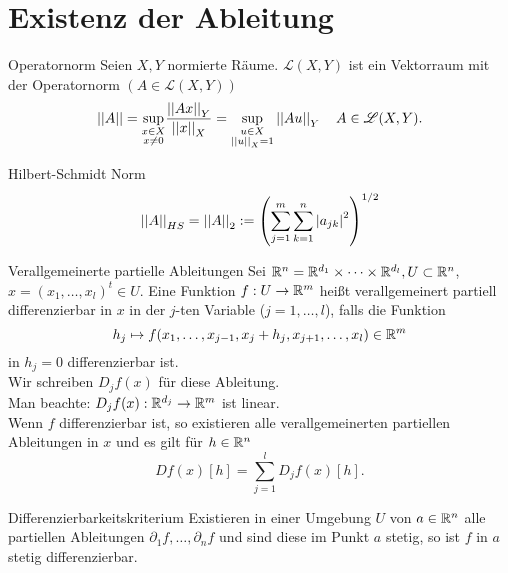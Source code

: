 \documentclass[main.tex]{subfiles}
\begin{document}
\section*{Existenz der Ableitung}

\begin{karte}{Operatornorm}
    Seien \(X, Y\) normierte Räume. 
    \( \mathscr{L}(X,Y) \) ist ein Vektorraum mit
    der Operatornorm \( (A \in \mathscr{L}(X,Y)) \)
    \[ \left|\left|A\right|\right| = \underset{\substack{x\in X\\x\neq 0}}{\sup}
    \frac{\left|\left|Ax\right|\right|_Y}{\left|\left|x\right|\right|_X} 
    = \underset{\substack{u\in X\\ \left|\left|u\right|\right|_X = 1}}{\sup}
    \left|\left|Au\right|\right|_Y
    \quad A \in \mathscr{L}(X,Y). \]
\end{karte}

\begin{karte}{Hilbert-Schmidt Norm}
    \[ \left|\left|A\right|\right|_{HS} = \left|\left|A\right|\right|_2 := \left( 
        \sum_{j=1}^m \sum_{k=1}^n \left| a_{jk} \right|^2 \right)^{1/2} \]
\end{karte}

\begin{karte}{Verallgemeinerte partielle Ableitungen}
    Sei \( \mathbb{R}^n = \mathbb{R}^{d_1} \times \dots \times \mathbb{R}^{d_l}, U \subset \mathbb{R}^n \),
    \( x = (x_1, \ldots, x_l)^t \in U \).
    Eine Funktion \( f : U \rightarrow \mathbb{R}^m \) heißt verallgemeinert
    partiell differenzierbar in \(x\) in der \(j\)-ten 
    Variable (\(j = 1, \ldots, l\)), falls die Funktion 
    \[ h_j \mapsto f(x_1,\ldots, x_{j-1}, x_j + h_j, 
    x_{j+1}, \ldots, x_l) \in \mathbb{R}^m \] 
    in \( h_j = 0 \) differenzierbar ist.\\
    Wir schreiben \(D_jf(x)\) für diese Ableitung.\\
    Man beachte: \( D_jf(x) : \mathbb{R}^{d_j} \rightarrow \mathbb{R}^m \) ist linear.\\
    Wenn \( f \) differenzierbar ist, so existieren alle 
    verallgemeinerten partiellen Ableitungen in \(x\) 
    und es gilt für \( h\in \mathbb{R}^n \)
    \[ Df(x)[h] = \sum_{j=1}^l D_j f(x)[h]. \]
\end{karte}

\begin{karte}{Differenzierbarkeitskriterium}
    Existieren in einer Umgebung \(U\) von \( a\in \mathbb{R}^n \) alle 
    partiellen Ableitungen \( \partial_1 f, \ldots, \partial_n f \) 
    und sind diese im Punkt \( a \) stetig, so ist \( f \) in \( a \) 
    stetig differenzierbar.
\end{karte}
\end{document}
